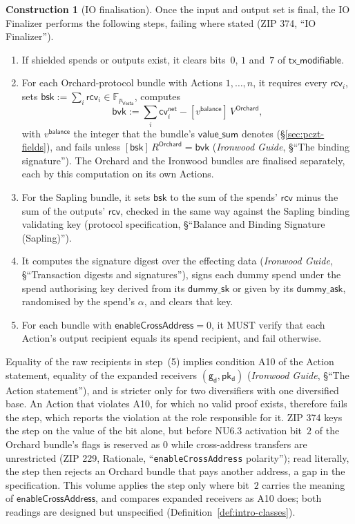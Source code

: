 \documentclass[11pt,a4paper]{article}
\theoremstyle{definition}
\newtheorem{construction}[theorem]{Construction}
\newcommand{\F}{\mathbb{F}}
\newcommand{\cvsym}{\mathsf{cv}}
\newcommand{\Vesta}{\ensuremath{\mathsf{Vesta}}}
\newcommand{\pkd}{\ensuremath{\mathsf{pk_d}}}
\newcommand{\gd}{\ensuremath{\mathsf{g_d}}}
\newcommand{\rcv}{\ensuremath{\mathsf{rcv}}}
\begin{document}
\begin{construction}[IO finalisation]\label{def:pczt-io-final}
Once the input and output set is final, the IO Finalizer performs the
following steps, failing where stated (ZIP 374, ``IO Finalizer'').
\begin{enumerate}[label=(\arabic*)]
\item If shielded spends or outputs exist, it clears bits~$0$, $1$ and~$7$
  of $\mathsf{tx\_modifiable}$.
\item For each Orchard-protocol bundle with Actions $1, \dots, n$, it
  requires every $\rcv_i$, sets $\mathsf{bsk} := \sum_i \rcv_i \in
  \F_{p_{\Vesta}}$, computes
  \[
    \mathsf{bvk} := \textstyle\sum_i \cvsym^{\mathsf{net}}_i -
      [v^{\mathsf{balance}}]\,V^{\mathsf{Orchard}},
  \]
  with $v^{\mathsf{balance}}$ the integer that the bundle's
  $\mathsf{value\_sum}$ denotes (\S\ref{sec:pczt-fields}), and fails unless
  $[\mathsf{bsk}]\,R^{\mathsf{Orchard}} = \mathsf{bvk}$ (\emph{Ironwood
  Guide}, \S``The binding signature''). The Orchard and the Ironwood
  bundles are finalised separately, each by this computation on its own
  Actions.
\item For the Sapling bundle, it sets $\mathsf{bsk}$ to the sum of the
  spends' $\rcv$ minus the sum of the outputs' $\rcv$, checked in the same
  way against the Sapling binding validating key (protocol specification,
  \S``Balance and Binding Signature (Sapling)'').
\item It computes the signature digest over the effecting data
  (\emph{Ironwood Guide}, \S``Transaction digests and signatures''), signs
  each dummy spend under the spend authorising key derived from its
  $\mathsf{dummy\_sk}$ or given by its $\mathsf{dummy\_ask}$, randomised by
  the spend's $\alpha$, and clears that key.
\item For each bundle with $\mathsf{enableCrossAddress} = 0$, it MUST
  verify that each Action's output recipient equals its spend recipient,
  and fail otherwise.
\end{enumerate}
Equality of the raw recipients in step~(5) implies condition A10 of the
Action statement, equality of the expanded receivers $(\gd, \pkd)$
(\emph{Ironwood Guide}, \S``The Action statement''), and is stricter only
for two diversifiers with one diversified base. An Action that violates
A10, for which no valid proof exists, therefore fails the step, which
reports the violation at the role responsible for it. ZIP 374 keys the step
on the value of the bit alone, but before NU6.3 activation bit~$2$ of the
Orchard bundle's flags is reserved as $0$ while cross-address transfers are
unrestricted (ZIP 229, Rationale, ``\texttt{enableCrossAddress}
polarity''); read literally, the step then rejects an Orchard bundle that
pays another address, a gap in the specification. This volume applies the
step only where bit~$2$ carries the meaning of
$\mathsf{enableCrossAddress}$, and compares expanded receivers as A10 does;
both readings are designed but unspecified
(Definition~\ref{def:intro-classes}).
\end{construction}
\end{document}
